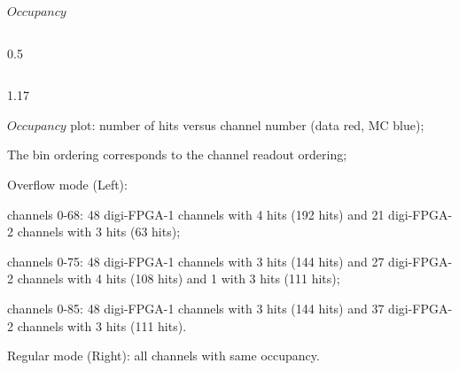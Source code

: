 \documentclass{beamer}
\begin{document}
\begin{frame}{$Occupancy$}
\begin{columns}
\begin{column}{0.5 \framewidth}
\begin{figure}[H]
          \label{fig:dfjkdsfh} 
\end{figure} 
    \end{column}
\end{columns}      
\vspace{-3.6mm}
 \begin{columns}
    \begin{column}{1.17\framewidth}
     \begin{itemize}
     {\small
      \item $Occupancy$ plot: number of hits versus channel number (data red, MC blue);
      \item The bin ordering corresponds to the channel readout ordering;
    \item Overflow mode (Left):  }
    \begin{itemize}
    {\small
        \item channels 0-68: 48 digi-FPGA-1 channels with 4 hits (192 hits) and 21 digi-FPGA-2 channels with 3 hits (63 hits);
        \item channels 0-75: 48 digi-FPGA-1 channels with 3 hits (144 hits) and 27 digi-FPGA-2 channels with 4 hits (108 hits) and 1 with 3 hits (111 hits);
        \item channels 0-85: 48 digi-FPGA-1 channels with 3 hits (144 hits) and 37 digi-FPGA-2 channels with 3 hits (111 hits).}
    \end{itemize}
    \item  {\small Regular mode (Right): all channels with same occupancy.
    }
   
        \end{itemize}
             \end{column}
\end{columns}     
\end{frame}
\end{document}
